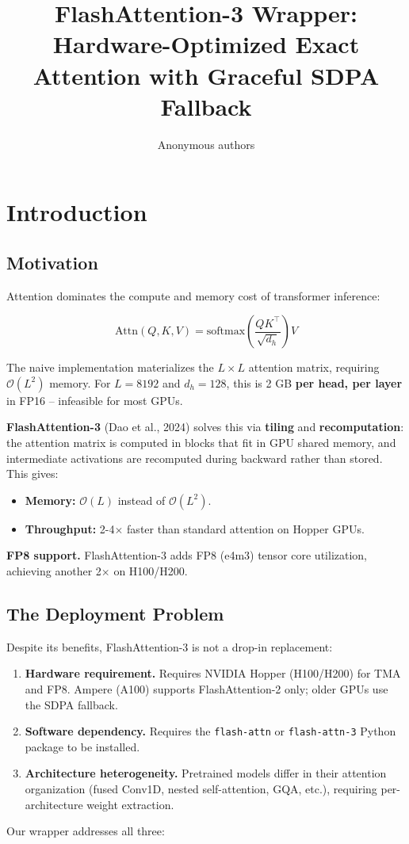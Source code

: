 \title{\textbf{FlashAttention-3 Wrapper: Hardware-Optimized Exact Attention with Graceful SDPA Fallback}}

\author{Anonymous authors}


\section{Introduction}

\subsection{Motivation}

Attention dominates the compute and memory cost of transformer inference:

\[
\text{Attn}(Q, K, V) = \text{softmax}\!\left(\frac{Q K^\top}{\sqrt{d_h}}\right) V
\tag{1.1}
\]

The naive implementation materializes the $L \times L$ attention matrix, 
requiring $\mathcal{O}(L^2)$ memory. For $L = 8192$ and $d_h = 128$, this 
is 2 GB \textbf{per head, per layer} in FP16 -- infeasible for most GPUs.

\textbf{FlashAttention-3} (Dao et al., 2024) solves this via \textbf{tiling} and 
\textbf{recomputation}: the attention matrix is computed in blocks that fit in 
GPU shared memory, and intermediate activations are recomputed during 
backward rather than stored. This gives:

\begin{itemize}
\item \textbf{Memory:} $\mathcal{O}(L)$ instead of $\mathcal{O}(L^2)$.
\item \textbf{Throughput:} 2-4$\times$ faster than standard attention on Hopper GPUs.

\end{itemize}
\textbf{FP8 support.} FlashAttention-3 adds FP8 (e4m3) tensor core utilization, 
achieving another 2$\times$ on H100/H200.

\subsection{The Deployment Problem}

Despite its benefits, FlashAttention-3 is not a drop-in replacement:

\begin{enumerate}
\item \textbf{Hardware requirement.} Requires NVIDIA Hopper (H100/H200) for
  TMA and FP8. Ampere (A100) supports FlashAttention-2 only; older GPUs
  use the SDPA fallback.
\item \textbf{Software dependency.} Requires the \texttt{flash-attn} or \texttt{flash-attn-3}
  Python package to be installed.
\item \textbf{Architecture heterogeneity.} Pretrained models differ in their
  attention organization (fused Conv1D, nested self-attention, GQA, etc.),
  requiring per-architecture weight extraction.

\end{enumerate}
Our wrapper addresses all three:

